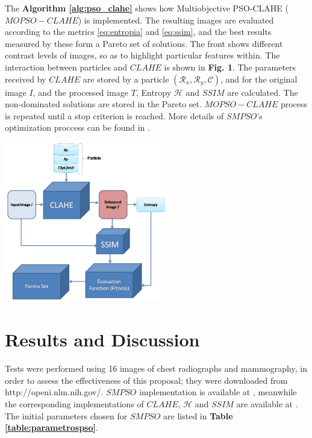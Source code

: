 \documentclass[spanish,twocolumn]{article}
\begin{document}
{The \textbf{Algorithm \ref{alg:pso_clahe}} shows how Multiobjective PSO-CLAHE ($MOPSO-CLAHE$) is implemented. The resulting images are evaluated according to the metrics \eqref{eq:entropia} and \eqref{eq:ssim}, and the best results measured by these form a Pareto set of solutions. The front shows different contrast levels of images, so as to highlight particular features within. The interaction between particles and $CLAHE$ is  shown in \textbf {Fig. 1}. The parameters received by $CLAHE$ are stored by a particle $(\mathcal{R}_x,\mathcal{R}_y, \mathscr{C})$, and for the original image $I$, and the processed image $T$, Entropy $\mathscr{H}$ and $SSIM$ are calculated. The non-dominated solutions are stored in the Pareto set. $MOPSO-CLAHE$ process is repeated until a stop criterion is reached. More details of $SMPSO$'s optimization proccess can be found in \cite{4938830}.
\begin{minipage}[b]{1.0\linewidth}
  \vspace{0.4cm}
  \centering
  \centerline{\includegraphics[height=7cm]{Figures/particula_clahe2}}
  \vspace{0.4cm}
  \label{fig:particula_clahe}
\end{minipage}

\section{Results and Discussion}
\label{sec:resultadosdiscusion}

 Tests were performed using 16 images of chest radiographs and mammography, in order to assess the effectiveness of this proposal; they were downloaded from http://openi.nlm.nih.gov/. $SMPSO$ implementation is available at \cite{5586354}, meanwhile the corresponding implementations of $CLAHE$, $\mathscr{H}$ and $SSIM$ are available at \cite{opencv_library}. The initial parameters chosen for $SMPSO$ are listed in \textbf{Table \ref{table:parametrospso}}.


}
\end{document}
